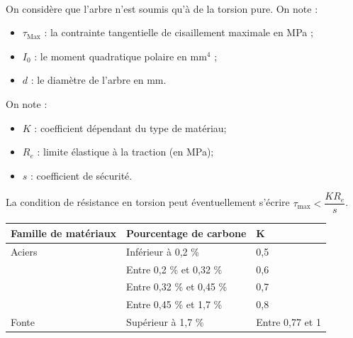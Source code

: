\ifprof
\begin{corrige}~\\
\end{corrige}
\else
\fi

On considère que l’arbre n’est soumis qu’à de la torsion pure.
On note :
\begin{itemize}
\item $\tau_{\text{Max}}$ : la contrainte tangentielle de cisaillement maximale en MPa ;
\item $I_0$ : le moment quadratique polaire en $\text{mm}^4$ ;
\item $d$ : le diamètre de l’arbre en mm.
\end{itemize}
On note :
\begin{itemize}
\item $K$ : coefficient dépendant du type de matériau;
\item $R_e$ : limite élastique à la traction (en MPa);
\item $s$ : coefficient de sécurité.
\end{itemize}

La condition de résistance en torsion peut éventuellement s'écrire $\tau_{\text{max}}< \dfrac{K R_e}{ s}$.

\begin{center}
\begin{tabular}{lll}
\hline
Famille de matériaux & Pourcentage de carbone & K \\ \hline 
Aciers & Inférieur à 0,2 \%	&0,5 \\ 
&Entre 0,2 \% et 0,32 \%	&0,6 \\ 
&Entre 0,32 \% et 0,45 \%	&0,7 \\ 
&Entre 0,45 \% et 1,7 \%	&0,8 \\ 
Fonte&Supérieur à 1,7 \%	&Entre 0,77 et 1 \\ \hline
\end{tabular}
\end{center}


\ifprof
\begin{corrige}~\\
\end{corrige}
\else
\fi


